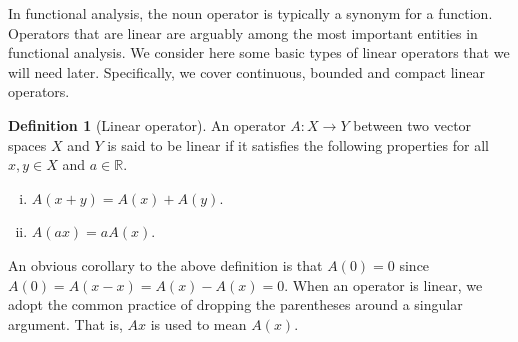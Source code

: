 \documentclass[english, 12pt, a4paper, sci, utf8, a-2b, online]{aaltothesis}
\theoremstyle{definition}
\newtheorem{definition}{Definition}[section]
\theoremstyle{plain}
\numberwithin{equation}{section}
\begin{document}
In functional analysis, the noun operator is typically a synonym for a function. 
Operators that are linear are arguably among the most important entities
in functional analysis. We consider here some basic types of linear operators
that we will need later. Specifically, we cover
continuous, bounded and compact linear operators.
\begin{definition}[Linear operator]
    \label{def:linearfunction}
    An operator $A: X \to Y$ between two vector spaces $X$ and $Y$
    is said to be linear if it satisfies the following properties
    for all $x,y \in X$ and $a \in \mathbb{R}$.
    \begin{enumerate}[(i)]
        \item $A(x+y) = A(x) + A(y)$.
        \item $A(ax) = a A(x)$.
    \end{enumerate}
\end{definition}
An obvious corollary to the above definition is that $A(0)=0$ since
$A(0)=A(x-x)=A(x)-A(x)=0$.
When an operator is linear, we adopt the common practice of dropping the parentheses
around a singular argument. That is, $Ax$ is used to mean $A(x)$.
\end{document}
